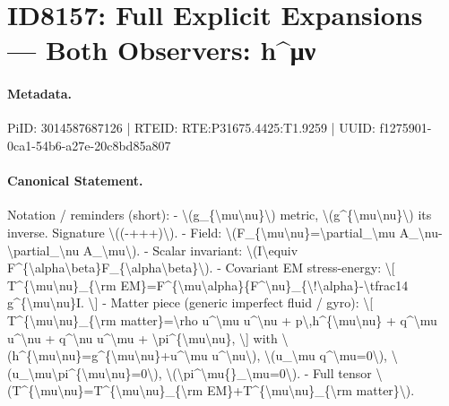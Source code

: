 \section*{ID8157: Full Explicit Expansions — Both Observers: h\textasciicircum{}μν}
\paragraph{Metadata.}
PiID: 3014587687126 | RTEID: RTE:P31675.4425:T1.9259 | UUID: f1275901-0ca1-54b6-a27e-20c8bd85a807

\paragraph{Canonical Statement.}
Notation / reminders (short): - \textbackslash{}(g\_\{\textbackslash{}mu\textbackslash{}nu\}\textbackslash{}) metric, \textbackslash{}(g\textasciicircum{}\{\textbackslash{}mu\textbackslash{}nu\}\textbackslash{}) its inverse. Signature \textbackslash{}((-+++)\textbackslash{}). - Field: \textbackslash{}(F\_\{\textbackslash{}mu\textbackslash{}nu\}=\textbackslash{}partial\_\textbackslash{}mu A\_\textbackslash{}nu-\textbackslash{}partial\_\textbackslash{}nu A\_\textbackslash{}mu\textbackslash{}). - Scalar invariant: \textbackslash{}(I\textbackslash{}equiv F\textasciicircum{}\{\textbackslash{}alpha\textbackslash{}beta\}F\_\{\textbackslash{}alpha\textbackslash{}beta\}\textbackslash{}). - Covariant EM stress-energy: \textbackslash{}[ T\textasciicircum{}\{\textbackslash{}mu\textbackslash{}nu\}\_\{\textbackslash{}rm EM\}=F\textasciicircum{}\{\textbackslash{}mu\textbackslash{}alpha\}\{F\textasciicircum{}\textbackslash{}nu\}\_\{\textbackslash{}!\textbackslash{}alpha\}-\textbackslash{}tfrac14 g\textasciicircum{}\{\textbackslash{}mu\textbackslash{}nu\}I. \textbackslash{}] - Matter piece (generic imperfect fluid / gyro): \textbackslash{}[ T\textasciicircum{}\{\textbackslash{}mu\textbackslash{}nu\}\_\{\textbackslash{}rm matter\}=\textbackslash{}rho u\textasciicircum{}\textbackslash{}mu u\textasciicircum{}\textbackslash{}nu + p\textbackslash{},h\textasciicircum{}\{\textbackslash{}mu\textbackslash{}nu\} + q\textasciicircum{}\textbackslash{}mu u\textasciicircum{}\textbackslash{}nu + q\textasciicircum{}\textbackslash{}nu u\textasciicircum{}\textbackslash{}mu + \textbackslash{}pi\textasciicircum{}\{\textbackslash{}mu\textbackslash{}nu\}, \textbackslash{}] with \textbackslash{}(h\textasciicircum{}\{\textbackslash{}mu\textbackslash{}nu\}=g\textasciicircum{}\{\textbackslash{}mu\textbackslash{}nu\}+u\textasciicircum{}\textbackslash{}mu u\textasciicircum{}\textbackslash{}nu\textbackslash{}), \textbackslash{}(u\_\textbackslash{}mu q\textasciicircum{}\textbackslash{}mu=0\textbackslash{}), \textbackslash{}(u\_\textbackslash{}mu\textbackslash{}pi\textasciicircum{}\{\textbackslash{}mu\textbackslash{}nu\}=0\textbackslash{}), \textbackslash{}(\textbackslash{}pi\textasciicircum{}\textbackslash{}mu\{\}\_\textbackslash{}mu=0\textbackslash{}). - Full tensor \textbackslash{}(T\textasciicircum{}\{\textbackslash{}mu\textbackslash{}nu\}=T\textasciicircum{}\{\textbackslash{}mu\textbackslash{}nu\}\_\{\textbackslash{}rm EM\}+T\textasciicircum{}\{\textbackslash{}mu\textbackslash{}nu\}\_\{\textbackslash{}rm matter\}\textbackslash{}).

